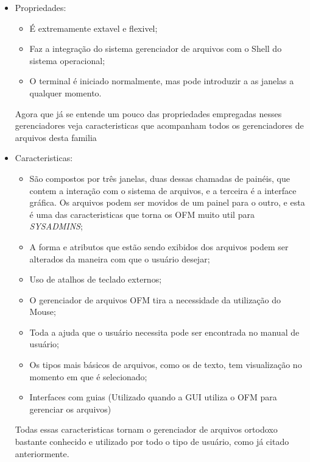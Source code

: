 \documentclass[12pt,a4paper,openany,oneside]{abntex2}
\begin{document}
\begin{itemize}
	\item Propriedades: \\
	\begin{itemize}
		\item É extremamente extavel e flexivel;
		\item Faz a integração do sistema gerenciador de arquivos com o Shell do sistema operacional;
		\item O terminal é iniciado normalmente, mas pode introduzir a as janelas a qualquer momento.
	\end{itemize}

Agora que já se entende um pouco das propriedades empregadas nesses gerenciadores veja caracteristicas que acompanham todos os gerenciadores de arquivos desta familia

	\item Caracteristicas: \\ 
	\begin{itemize}
		\item São compostos por três janelas, duas dessas chamadas de painéis, que contem a interação com o sistema de arquivos, e a terceira é a interface gráfica. Os arquivos podem ser movidos de um painel para o outro, e esta é uma das caracteristicas que torna os OFM muito util para \textit{SYSADMINS};
		\item A forma e atributos que estão sendo exibidos dos arquivos podem ser alterados da maneira com que o usuário desejar;
		\item Uso de atalhos de teclado externos;
		\item O gerenciador de arquivos OFM tira a necessidade da utilização do Mouse;
		\item Toda a ajuda que o usuário necessita pode ser encontrada no manual de usuário;
		\item Os tipos mais básicos de arquivos, como os de texto, tem visualização no momento em que é selecionado;
		\item Interfaces com guias (Utilizado quando a GUI utiliza o OFM para gerenciar os arquivos)
	\end{itemize}

Todas essas caracteristicas tornam o gerenciador de arquivos ortodoxo bastante conhecido e utilizado por todo o tipo de usuário, como já citado anteriormente.
\end{itemize}

\end{document}
